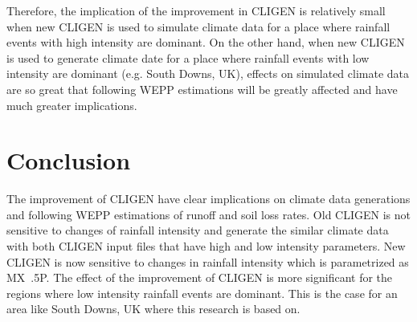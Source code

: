 Therefore, the implication of the improvement in CLIGEN is relatively small when
new CLIGEN is used to simulate climate data for a place where rainfall events
with high intensity are dominant. On the other hand, when new CLIGEN is used to
generate climate date for a place where rainfall events with low intensity are
dominant (e.g. South Downs, UK), effects on simulated climate data are so great
that following WEPP estimations will be greatly affected and have much greater
implications.


\section{Conclusion}
\label{sec:ImprovedCLIGENConclusion}
The improvement of CLIGEN have clear implications on climate data generations
and following WEPP estimations of runoff and soil loss rates. Old CLIGEN is not
sensitive to changes of rainfall intensity and generate the similar climate data
with both CLIGEN input files that have high and low intensity parameters. New
CLIGEN is now sensitive to changes in rainfall intensity which is parametrized
as MX~.5P. The effect of the improvement of CLIGEN is more significant for the
regions where low intensity rainfall events are dominant. This is the case for
an area like South Downs, UK where this research is based on.



